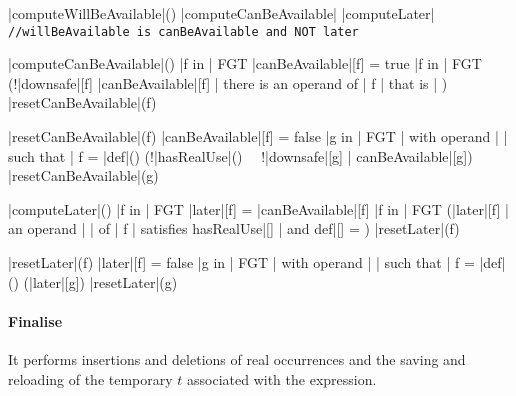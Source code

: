 \documentclass[a4paper,12pt, notitlepage]{article}
\newcommand{\negv}{\vspace{-0.7cm}}
\begin{document}
\begin{program}
\PROC |computeWillBeAvailable|() \BODY
    |computeCanBeAvailable|
    |computeLater|
    \texttt{//willBeAvailable is canBeAvailable and NOT later}
\end{program}
\negv
\begin{program}
\PROC |computeCanBeAvailable|() \BODY
    \FOREACH |f in | FGT \DO
        |canBeAvailable|[f] = true
    \OD
    \FOREACH |f in | FGT \DO
        \IF (!|downsafe|[f] \land |canBeAvailable|[f] \land | there is an operand of | f | that is | \bot) \AR*
            |resetCanBeAvailable|(f)
        \FI
    \OD
\end{program}
\negv
\begin{program}
\PROC |resetCanBeAvailable|(f) \BODY
    |canBeAvailable|[f] = false
    \FOREACH |g in | FGT | with operand | \omega | such that | f = |def|(\omega) \DO
        \IF (!|hasRealUse|(\omega) \ \land \ !|downsafe|[g] \land | canBeAvailable|[g]) \AR*
            |resetCanBeAvailable|(g)
    \OD
\end{program}
\negv
\begin{program}
\PROC |computeLater|() \BODY
    \FOREACH |f in | FGT \DO
        |later|[f] = |canBeAvailable|[f]
    \OD
    \FOREACH |f in | FGT \DO
        \IF (|later|[f] \land | an operand | \omega | of | f | satisfies hasRealUse|[\omega] | and def|[\omega] \not= \bot) \AR*
            |resetLater|(f)
        \FI
    \OD
\end{program}
\negv
\begin{program}
\PROC |resetLater|(f) \BODY
    |later|[f] = false
    \FOREACH |g in | FGT | with operand | \omega | such that | f = |def|(\omega) \DO
        \IF (|later|[g]) \AR*
            |resetLater|(g)
    \OD
\end{program}

\paragraph*{Finalise}
It performs insertions and deletions of real occurrences and the saving and
reloading of the temporary $t$ associated with the expression.
\end{document}
